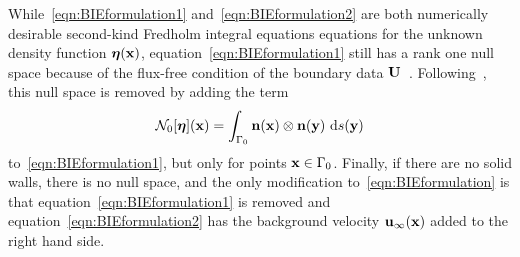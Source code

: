 \documentclass[preprint, 10pt]{elsarticle}
\begin{document}
While~\eqref{eqn:BIEformulation1} and~\eqref{eqn:BIEformulation2} are
both numerically desirable second-kind Fredholm integral equations
equations  for the unknown density function ${\boldsymbol\eta}({\mathbf{x}})$,
equation~\eqref{eqn:BIEformulation1} still has a rank one null space
because of the flux-free condition of the boundary data
${\mathbf{U}}$~\cite{Ladyzhenskaya1963}.  Following~\cite{Power1993}, this null
space is removed by adding the term 
\begin{align}
\label{eq:N0_modification} 
  \mathcal{N}_0[{\boldsymbol\eta}]({\mathbf{x}}) = \int_{\Gamma_0} 
    {\mathbf{n}}({\mathbf{x}})\otimes{\mathbf{n}}({\mathbf{y}})~\text{d}s(\mathbf{y})
\end{align}
to~\eqref{eqn:BIEformulation1}, but only for points ${\mathbf{x}} \in \Gamma_0$.
Finally, if there are no solid walls, there is no null space, and
the only modification to~\eqref{eqn:BIEformulation} is that
equation~\eqref{eqn:BIEformulation1} is removed and
equation~\eqref{eqn:BIEformulation2} has the background velocity
${\mathbf{u}}_\infty({\mathbf{x}})$ added to the right hand side.
\end{document}
